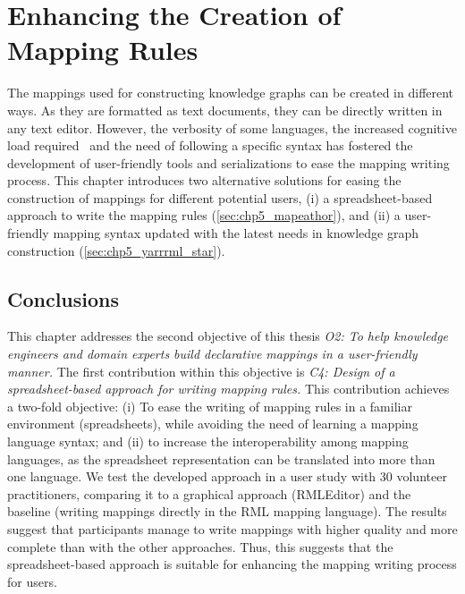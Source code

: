 
\chapter{Enhancing the Creation of Mapping Rules}
\label{chapter:creation}

The mappings used for constructing knowledge graphs can be created in different ways. As they are formatted as text documents, they can be directly written in any text editor. However, the verbosity of some languages, the increased cognitive load required~\parencite{junior2018mental} and the need of following a specific syntax has fostered the development of user-friendly tools and serializations to ease the mapping writing process. This chapter introduces two alternative solutions for easing the construction of mappings for different potential users, (i) a spreadsheet-based approach to write the mapping rules (\cref{sec:chp5_mapeathor}), and (ii) a user-friendly mapping syntax updated with the latest needs in knowledge graph construction (\cref{sec:chp5_yarrrml_star}).





\section{Conclusions}

This chapter addresses the second objective of this thesis \textit{O2: To help knowledge engineers and domain experts build declarative mappings in a user-friendly manner.}
The first contribution within this objective is \textit{C4: Design of a spreadsheet-based approach for writing mapping rules.} This contribution achieves a two-fold objective: (i) To ease the writing of mapping rules in a familiar environment (spreadsheets), while avoiding the need of learning a mapping language syntax; and (ii) to increase the interoperability among mapping languages, as the spreadsheet representation can be translated into more than one language. We test the developed approach in a user study with 30 volunteer practitioners, comparing it to a graphical approach (RMLEditor) and the baseline (writing mappings directly in the RML mapping language). The results suggest that participants manage to write mappings with higher quality and more complete than with the other approaches. Thus, this suggests that the spreadsheet-based approach is suitable for enhancing the mapping writing process for users. 

